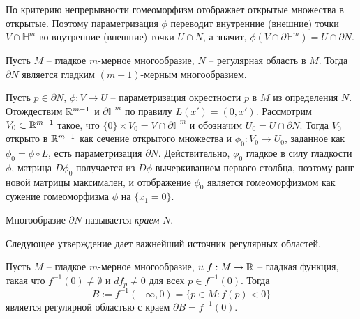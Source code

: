 \begin{note}
    По критерию непрерывности гомеоморфизм отображает открытые множества в открытые. Поэтому параметризация $\phi$ переводит внутренние (внешние) точки $V \cap \mathbb{H}^m$ во внутренние (внешние) точки $U \cap N$, а значит, $\phi(V \cap \partial \mathbb{H}^m) = U \cap \partial N$.
\end{note}

\begin{lemma}
    Пусть $M$ -- гладкое $m$-мерное многообразие, $N$ -- регулярная область в $M$. Тогда $\partial N$ является гладким $(m-1)$-мерным многообразием.
\end{lemma}

\begin{myproof}
	Пусть $p \in \partial N$, $\phi : V \to U$ -- параметризация окрестности $p$ в $M$ из определения $N$.
    Отождествим $\mathbb{R}^{m-1}$ и $\partial \mathbb{H}^m$ по правилу $L(x') = (0, x')$.
	Рассмотрим $V_0 \subset \mathbb{R}^{m-1}$ такое, что $\{0\} \times V_0 = V \cap \partial \mathbb{H}^m$ и обозначим $U_0 = U \cap \partial N$.
	Тогда $V_0$ открыто в $\mathbb{R}^{m-1}$ как сечение открытого множества и $\phi_0: V_0 \to U_0$, заданное как $\phi_0 = \phi \circ L$, есть параметризация $\partial N$.
	Действительно, $\phi_0$ гладкое в силу гладкости $\phi$, матрица $D\phi_0$ получается из $D\phi$ вычеркиванием первого столбца, поэтому ранг новой матрицы максимален, и отображение $\phi_0$ является гомеоморфизмом как сужение гомеоморфизма $\phi$ на $\{x_1 = 0\}$. %
\end{myproof}

\begin{definition}
	Многообразие $\partial N$ называется \textit{краем} $N$.
\end{definition}

Следующее утверждение дает важнейший источник регулярных областей.

\begin{theorem}
    Пусть $M$ -- гладкое $m$-мерное многообразие, $u \ f: M \to \mathbb{R}$ -- гладкая функция, такая что $f^{-1}(0) \ne \emptyset$ и $df_p \ne 0$ для всех $p \in f^{-1}(0)$. Тогда
    \[
    B := f^{-1}(-\infty, 0) = \{p \in M : f(p) < 0\}
    \]
    является регулярной областью с краем $\partial B = f^{-1}(0)$.
\end{theorem}

